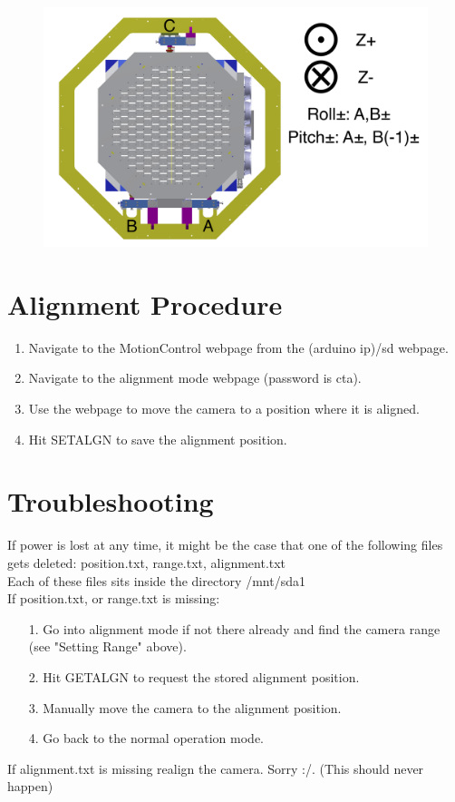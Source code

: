 \documentclass[11pt]{article}
\begin{document}
\begin{figure}[h]
\begin{center}
\includegraphics[width = 4.5in]{camerapic.png}
\caption{}  
\label{fd2}
\end{center}
\end{figure}


\section{Alignment Procedure}
\begin{enumerate}
	\item Navigate to the MotionControl webpage from the (arduino ip)/sd webpage.
	\item Navigate to the alignment mode webpage (password is cta).
	\item Use the webpage to move the camera to a position where it is aligned.
	\item Hit SETALGN to save the alignment position.
\end{enumerate}

\section{Troubleshooting}
If power is lost at any time, it might be the case that one of the following files gets deleted: position.txt, range.txt, alignment.txt\\[15pt]
Each of these files sits inside the directory /mnt/sda1\\[15pt]
If position.txt, or range.txt is missing:
\begin{enumerate}
\item[1.] Go into alignment mode if not there already and find the camera range (see "Setting Range" above).
\item[2.] Hit GETALGN to request the stored alignment position.
\item[3.] Manually move the camera to the alignment position.
\item[4.] Go back to the normal operation mode.
\end{enumerate}
If alignment.txt is missing realign the camera. Sorry :/. (This should never happen)
\end{document}

